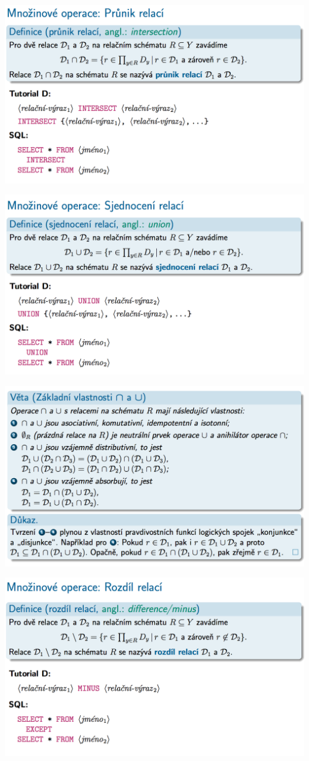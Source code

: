 \documentclass[10pt,a4paper]{article}
\begin{document}
	\includegraphics[scale=0.4]{img/21}
	
	\includegraphics[scale=0.4]{img/22}
	
	\includegraphics[scale=0.4]{img/23}
	
	\includegraphics[scale=0.4]{img/24}
	
\end{document}
